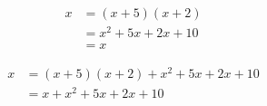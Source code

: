 \documentclass{minimal}
\begin{document}
\begin{align}
  x &= (x+5)(x+2)
 \\ &= x^2 + 5x + 2x + 10
 \\ &= x
\end{align}

\begin{align}
  x &= (x+5)(x+2)
       + x^2 + 5x + 2x + 10
 \\ &= x
       + x^2 + 5x + 2x + 10
\end{align}
\end{document}

